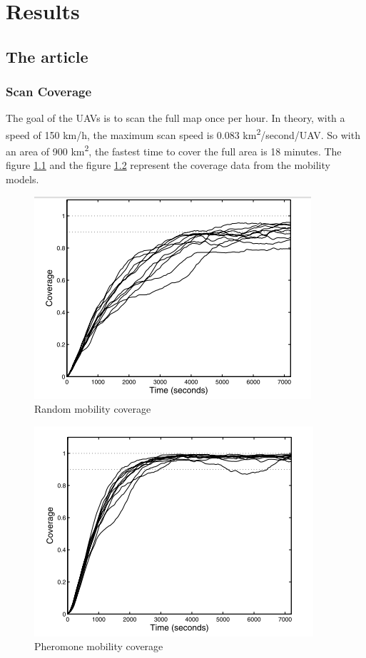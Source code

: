 \chapter{Results}

\section{The article}
\subsection{Scan Coverage}
The goal of the UAVs is to scan the full map once per hour. In theory, with a speed of 150 km/h, the maximum scan speed is 0.083 km\textsuperscript{2}/second/UAV. So with an area of 900 km\textsuperscript{2}, the fastest time to cover the full area is 18 minutes. The figure \ref{randomcoverage} and the figure \ref{pheromonecoverage} represent the coverage data from the mobility models.

\begin{figure}[h]
\caption{\label{randomcoverage} Random mobility coverage}
   \includegraphics{../images/random_coverage.png}
\end{figure}

\begin{figure}[h]
\caption{\label{pheromonecoverage} Pheromone mobility coverage}
   \includegraphics{../images/pheromone_coverage.png}
\end{figure}

